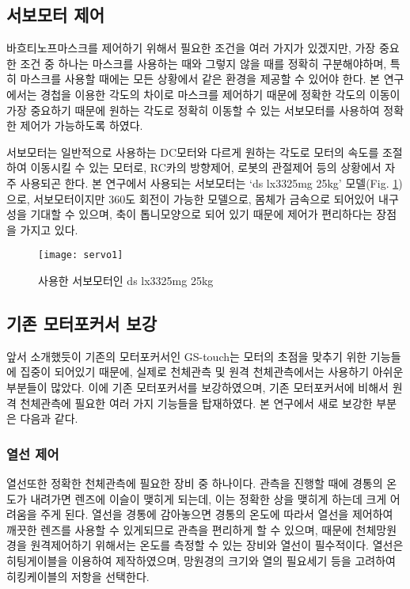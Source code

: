 \subsection{서보모터 제어}
바흐티노프마스크를 제어하기 위해서 필요한 조건을 여러 가지가 있겠지만, 가장 중요한 조건 중 하나는 마스크를 사용하는 때와 그렇지 않을 때를 정확히 구분해야하며, 특히 마스크를 사용할 때에는 모든 상황에서 같은 환경을 제공할 수 있어야 한다. 본 연구에서는 경첩을 이용한 각도의 차이로 마스크를 제어하기 때문에 정확한 각도의 이동이 가장 중요하기 때문에 원하는 각도로 정확히 이동할 수 있는 서보모터를 사용하여 정확한 제어가 가능하도록 하였다.


서보모터는 일반적으로 사용하는 DC모터와 다르게 원하는 각도로 모터의 속도를 조절하여 이동시킬 수 있는 모터로,  RC카의 방향제어, 로봇의 관절제어 등의 상황에서 자주 사용되곤 한다. 본 연구에서 사용되는 서보모터는 ‘ds lx3325mg 25kg’ 모델(Fig. \ref{motor})으로, 서보모터이지만 360도 회전이 가능한 모델으로, 몸체가 금속으로 되어있어 내구성을 기대할 수 있으며, 축이 톱니모양으로 되어 있기 때문에 제어가 편리하다는 장점을 가지고 있다.

\begin{figure}[h]
	\begin{center}
		\texttt{[image: servo1]}
	\end{center}
	\caption{사용한 서보모터인 ds lx3325mg 25kg}
	\label{motor}
\end{figure}

\subsection{기존 모터포커서 보강}

앞서 소개했듯이 기존의 모터포커서인 GS-touch는 모터의 초점을 맞추기 위한 기능들에 집중이 되어있기 때문에, 실제로 천체관측 및 원격 천체관측에서는 사용하기 아쉬운 부분들이 많았다. 이에 기존 모터포커서를 보강하였으며, 기존 모터포커서에 비해서 원격 천체관측에 필요한 여러 가지 기능들을 탑재하였다. 본 연구에서 새로 보강한 부분은 다음과 같다.
\subsubsection{열선 제어}
열선또한 정확한 천체관측에 필요한 장비 중 하나이다. 관측을 진행할 때에 경통의 온도가 내려가면 렌즈에 이슬이 맺히게 되는데, 이는 정확한 상을 맺히게 하는데 크게 어려움을 주게 된다. 열선을 경통에 감아놓으면 경통의 온도에 따라서 열선을 제어하여 깨끗한 렌즈를 사용할 수 있게되므로 관측을 편리하게 할 수 있으며, 때문에 천체망원경을 원격제어하기 위해서는 온도를 측정할 수 있는 장비와 열선이 필수적이다. 열선은 히팅게이블을 이용하여 제작하였으며, 망원경의 크기와 열의 필요세기 등을 고려하여 히킹케이블의 저항을 선택한다.

